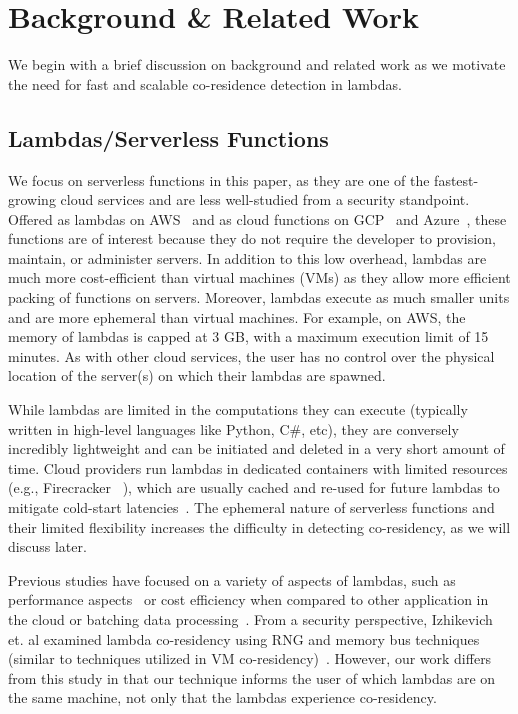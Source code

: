 \section{Background \& Related Work}
\label{sec:background}

We begin with a brief discussion on background and related work as we motivate
the need for fast and scalable co-residence detection in lambdas.

\subsection{Lambdas/Serverless Functions} 
\label{sec:background:lambdas}

We focus on serverless functions in this paper, as they are one of the
fastest-growing cloud services and are less well-studied from a security
standpoint. Offered as lambdas on AWS~\cite{awslambda} and as cloud functions
on GCP~\cite{gcpfunctions} and Azure~\cite{azurefunctions}, these functions are
of interest because they do not require the developer to provision, maintain, or
administer servers. In addition to this low overhead, lambdas are much more
cost-efficient than virtual machines (VMs) as they allow more efficient packing
of functions on servers. Moreover, lambdas execute as much smaller units  and
are more ephemeral than virtual machines.  For example, on AWS,
the memory of lambdas is capped at 3 GB, with a maximum execution limit of 15
minutes.  As with other cloud services, the user has no control over the
physical location of the server(s) on which their lambdas are spawned.

While lambdas are limited in the computations they can execute (typically
written in high-level languages like Python, C\#, etc), they are conversely
incredibly lightweight and can be initiated and deleted in a very short amount
of time. Cloud providers run lambdas in dedicated containers with limited
resources (e.g., Firecracker ~\cite{firecracker}), which are usually cached and
re-used for future lambdas to mitigate cold-start
latencies~\cite{awscontainerreuse}. The ephemeral nature of serverless functions
and their limited flexibility increases the difficulty in detecting
co-residency, as we will discuss later. 

Previous studies have focused on a variety of aspects of lambdas, such as
performance aspects~\cite{wangusenix2018} or cost efficiency when compared to
other application in the cloud or batching data processing~\cite{villamizar2016,
kiran2015}. From a security perspective, Izhikevich et.  al examined lambda
co-residency using RNG and memory bus techniques (similar to techniques utilized
in VM co-residency)~\cite{izhikevich2018}. However, our work differs from this
study in that our technique informs the user of which lambdas are on the same
machine, not only that the lambdas experience co-residency.

